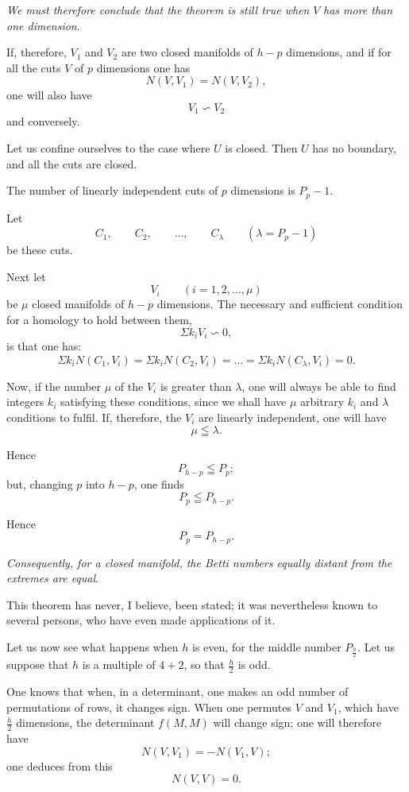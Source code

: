 \documentclass{article}
\begin{document}
\emph{We must therefore conclude that the theorem is still true when} $V$ \emph{has more than one dimension}.

If, therefore, $V_{1}$ and $V_{2}$ are two closed manifolds of $h-p$ dimensions, and if for all the cuts $V$ of $p$ dimensions one has
\[
N(V, V_{1}) = N(V, V_{2}),
\]
one will also have
\[
V_{1} \backsim V_{2}
\]
and conversely.

Let us confine ourselves to the case where $U$ is closed. Then $U$ has no boundary, and all the cuts are closed.

The number of linearly independent cuts of $p$ dimensions is $P_{p} - 1$.

Let
\[
C_{1}, \qquad C_{2}, \qquad \ldots, \qquad C_{\lambda} \qquad (\lambda = P_{p} - 1)
\]
be these cuts.

Next let
\[
V_{i} \qquad (i = 1, 2, \ldots, \mu)
\]
be $\mu$ closed manifolds of $h-p$ dimensions.
The necessary and sufficient condition for a homology to hold between them,
\[
\Sigma k_{i}V_{i} \backsim 0,
\]
is that one has:
\[
\Sigma k_{i}N(C_{1}, V_{i}) = \Sigma k_{i}N(C_{2}, V_{i}) = \ldots = \Sigma k_{i}N(C_{\lambda}, V_{i}) = 0.
\]

Now, if the number $\mu$ of the $V_{i}$ is greater than $\lambda$, one will always be able to find integers $k_{i}$ satisfying these conditions, since we shall have $\mu$ arbitrary $k_{i}$ and $\lambda$ conditions to fulfil. If, therefore, the $V_{i}$ are linearly independent, one will have
\[
\mu \leqq \lambda.
\]

Hence
\[
P_{h-p} \leqq P_{p};
\]
but, changing $p$ into $h-p$, one finds
\[
P_{p} \leqq P_{h-p}.
\]

Hence
\[
P_{p} = P_{h-p}.
\]

\emph{Consequently, for a closed manifold, the Betti numbers equally distant from the extremes are equal}.

This theorem has never, I believe, been stated; it was nevertheless known to several persons, who have even made applications of it.

Let us now see what happens when $h$ is even, for the middle number $P_{\frac{h}{2}}$. Let us suppose that $h$ is a multiple of $4 + 2$, so that $\frac{h}{2}$ is odd.

One knows that when, in a determinant, one makes an odd number of permutations of rows, it changes sign. When one permutes $V$ and $V_{1}$, which have $\frac{h}{2}$ dimensions, the determinant $f(M, M)$ will change sign; one will therefore have
\[
N(V, V_{1}) = -N(V_{1}, V);
\]
one deduces from this
\[
N(V, V) = 0.
\]
\end{document}
